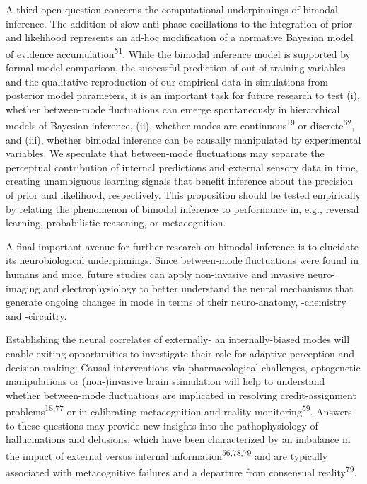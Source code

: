 \documentclass[
]{article}
\begin{document}
A third open question concerns the computational underpinnings of
bimodal inference. The addition of slow anti-phase oscillations to the
integration of prior and likelihood represents an ad-hoc modification of
a normative Bayesian model of evidence accumulation\textsuperscript{51}.
While the bimodal inference model is supported by formal model
comparison, the successful prediction of out-of-training variables and
the qualitative reproduction of our empirical data in simulations from
posterior model parameters, it is an important task for future research
to test (i), whether between-mode fluctuations can emerge spontaneously
in hierarchical models of Bayesian inference, (ii), whether modes are
continuous\textsuperscript{19} or discrete\textsuperscript{62}, and
(iii), whether bimodal inference can be causally manipulated by
experimental variables. We speculate that between-mode fluctuations may
separate the perceptual contribution of internal predictions and
external sensory data in time, creating unambiguous learning signals
that benefit inference about the precision of prior and likelihood,
respectively. This proposition should be tested empirically by relating
the phenomenon of bimodal inference to performance in, e.g., reversal
learning, probabilistic reasoning, or metacognition.

A final important avenue for further research on bimodal inference is to
elucidate its neurobiological underpinnings. Since between-mode
fluctuations were found in humans and mice, future studies can apply
non-invasive and invasive neuro-imaging and electrophysiology to better
understand the neural mechanisms that generate ongoing changes in mode
in terms of their neuro-anatomy, -chemistry and -circuitry.

Establishing the neural correlates of externally- an internally-biased
modes will enable exiting opportunities to investigate their role for
adaptive perception and decision-making: Causal interventions via
pharmacological challenges, optogenetic manipulations or (non-)invasive
brain stimulation will help to understand whether between-mode
fluctuations are implicated in resolving credit-assignment
problems\textsuperscript{18,77} or in calibrating metacognition and
reality monitoring\textsuperscript{59}. Answers to these questions may
provide new insights into the pathophysiology of hallucinations and
delusions, which have been characterized by an imbalance in the impact
of external versus internal information\textsuperscript{56,78,79} and
are typically associated with metacognitive failures and a departure
from consensual reality\textsuperscript{79}.
\end{document}
